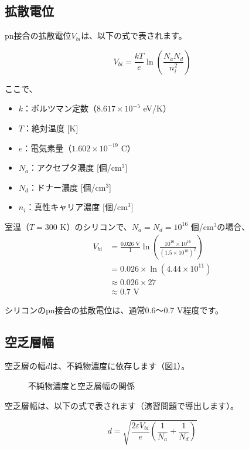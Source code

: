 \subsection{拡散電位}

pn接合の拡散電位$V_{bi}$は、以下の式で表されます。

\begin{equation}
V_{bi} = \frac{kT}{e} \ln\left(\frac{N_a N_d}{n_i^2}\right)
\end{equation}

ここで、
\begin{itemize}
\item $k$：ボルツマン定数（$8.617 \times 10^{-5}$ eV/K）
\item $T$：絶対温度 [K]
\item $e$：電気素量（$1.602 \times 10^{-19}$ C）
\item $N_a$：アクセプタ濃度 [個/cm$^3$]
\item $N_d$：ドナー濃度 [個/cm$^3$]
\item $n_i$：真性キャリア濃度 [個/cm$^3$]
\end{itemize}

室温（$T = 300$ K）のシリコンで、$N_a = N_d = 10^{16}$ 個/cm$^3$の場合、
\begin{align}
V_{bi} &= \frac{0.026 \text{ V}}{1} \ln\left(\frac{10^{16} \times 10^{16}}{(1.5 \times 10^{10})^2}\right) \\
&= 0.026 \times \ln(4.44 \times 10^{11}) \\
&\approx 0.026 \times 27 \\
&\approx 0.7 \text{ V}
\end{align}

シリコンのpn接合の拡散電位は、通常0.6〜0.7 V程度です。

\subsection{空乏層幅}

空乏層の幅$d$は、不純物濃度に依存します（図\ref{fig:depletion_width}）。

\begin{figure}[H]
\centering
{}
\caption{不純物濃度と空乏層幅の関係}
\label{fig:depletion_width}
\end{figure}

空乏層幅は、以下の式で表されます（演習問題で導出します）。

\begin{equation}
d = \sqrt{\frac{2\varepsilon V_{bi}}{e}\left(\frac{1}{N_a} + \frac{1}{N_d}\right)}
\end{equation}

